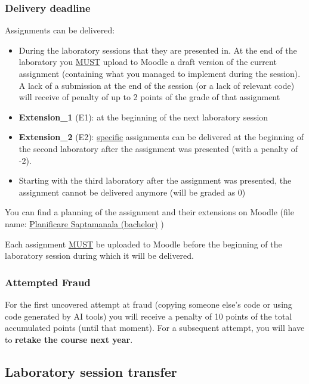 \documentclass[../en-fa-lab.tex]{subfiles}
\begin{document}
\subsubsection{\texorpdfstring{\textbf{Delivery
deadline}}{Delivery deadline}}\label{delivery-deadline}

Assignments can be delivered:

\begin{itemize}
\item
  During the laboratory sessions that they are presented in. At the end
  of the laboratory you \ul{MUST} upload to Moodle a draft version of
  the current assignment (containing what you managed to implement
  during the session). A lack of a submission at the end of the session
  (or a lack of relevant code) will receive of penalty of up to 2 points
  of the grade of that assignment
\item
  \textbf{Extension\_1} (E1): at the beginning of the next laboratory
  session
\item
  \textbf{Extension\_2} (E2): \ul{specific} assignments can be delivered
  at the beginning of the second laboratory after the assignment was
  presented (with a penalty of -2).
\item
  Starting with the third laboratory after the assignment was presented,
  the assignment cannot be delivered anymore (will be graded as 0)
\end{itemize}

You can find a planning of the assignment and their extensions on Moodle
(file name: \ul{Planificare Saptamanala (bachelor)} )

Each assignment \ul{MUST} be uploaded to Moodle before the beginning of
the laboratory session during which it will be delivered.

\subsubsection{\texorpdfstring{\textbf{Attempted
Fraud}}{Attempted Fraud}}\label{attempted-fraud}

For the first uncovered attempt at fraud (copying someone else's code or using code generated by AI tools)
you will receive a penalty of 10 points of the total accumulated points
(until that moment). For a subsequent attempt, you will have to \textbf{retake the course next year}.

\subsection{\texorpdfstring{\textbf{Laboratory session
transfer}}{Laboratory session transfer}}\label{laboratory-session-transfer}
\end{document}
